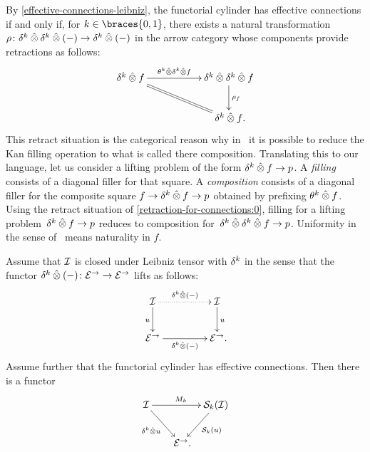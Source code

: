 \documentclass[reqno,10pt,a4paper,oneside,draft]{amsart}
\begin{document}
\begin{remark} \label{retraction-for-connections}
By \cref{effective-connections-leibniz}, the functorial cylinder has effective connections if and only if, for $k \in \braces{0, 1}$, there exists a natural transformation $\rho \co \kcyl \hatotimes \kcyl \hatotimes (-) \to \kcyl \hatotimes (-)$ in the arrow category whose components provide retractions as follows:
\begin{equation} \label{retraction-for-connections:0}
\xymatrix@C+3em{
  \kcyl \hatotimes f
  \ar[r]^-{\thetak \hatotimes \kcyl \hatotimes f}
  \ar@{=}[dr]
&
  \kcyl \hatotimes \kcyl \hatotimes f
  \ar[d]^{\rho_f}
\\&
  \kcyl \hatotimes f
\rlap{.}}
\end{equation}
This retract situation is the categorical reason why in~\cite{cohen-et-al:cubicaltt} 
it is possible to reduce the Kan filling operation to what is called there composition.
Translating this to our language, let us consider a lifting problem of the form $\kcyl \hatotimes f \to p$.
A \emph{filling} consists of a diagonal filler for that square.
A \emph{composition} consists of a diagonal filler for the composite square $f \to \kcyl \hatotimes f \to p$ obtained by prefixing $\theta^k \hatotimes f$.
Using the retract situation of \eqref{retraction-for-connections:0}, filling for a lifting 
problem~$\kcyl \hatotimes f \to p$ reduces to composition for~$\kcyl \hatotimes \kcyl \hatotimes f \to p$.
Uniformity in the sense of~\cite{cohen-et-al:cubicaltt} means naturality in $f$.
\end{remark}






\begin{lemma} \label{lem:to-strong-hequiv}
Assume that $\cal{I}$ is closed under Leibniz tensor with $\kcyl$ in the sense that the functor $\kcyl \hatotimes (-) \co \catE^\to \to \catE^\to$ lifts as follows:
\begin{equation}
\label{to-strong-hequiv:0}
\begin{gathered}
\xymatrix@C+2em{
  \cal{I}
  \ar[d]_{u}
  \ar@{.>}[r]^{\kcyl \hatotimes (-)}
&
  \cal{I}
  \ar[d]^{u}
\\
  \catE^\to
  \ar[r]_{\kcyl \hatotimes (-)}
&
  \catE^\to
\rlap{.}}
\end{gathered}
\end{equation}
Assume further that the functorial cylinder has effective connections.
Then there is a functor
\[
\xymatrix@!C@C-2em{
  \cal{I}
  \ar[dr]_{\kcyl \hatotimes u} \ar[rr]^{M_k}
&&
  \cal{S}_k(\cal{I})
  \ar[dl]^{\cal{S}_k(u)}
\\&
   \catE^\to
\rlap{.}}
\]
\end{lemma}
\end{document}
